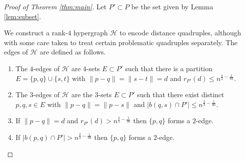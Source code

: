 \documentclass[11pt,oneside]{amsart}
\newcommand{\cG}{\mathcal{G}}
\newcommand{\cH}{\mathcal{H}}
\numberwithin{exercise}{subsection}
\begin{document}
\begin{proof}[Proof of Theorem \ref{thm:main}]
Let $P' \subset P$ be the set given by Lemma \ref{lem:subset}. 

We construct a rank-$4$ hypergraph $\cH$ to encode distance quadruples, although with some care taken to treat certain problematic quadruples separately. The edges of $\cH$ are defined as follows.

\begin{enumerate}
    \item The $4$-edges of $\cH$ are $4$-sets $E\subset P'$ such that there is a partition \(E=\{p,q\}\cup\{s,t\}\) with $\|p-q\|=\|s-t\|=d$ and $r_{P'}(d) \leq n^{\frac{4}{3} - \frac{1}{99}}$.
    \item The $3$-edges of $\cH$ are the $3$-sets \(E\subset P'\) such that
there exist distinct \(p,q,s\in E\) with $\|p-q\|=\|p-s\|$ and $|b(q,s) \cap P'| \leq n^{\frac{2}{3} - \frac{1}{90}}$.
    \item If $\|p-q\|=d$ and $r_{P'}(d) > n^{\frac{4}{3} - \frac{1}{99}}$ then $\{p,q\}$ forms a $2$-edge.
    \item  If $|b(p,q) \cap P'| > n^{\frac{2}{3} - \frac{1}{90}}$ then $\{p,q\}$ forms a $2$-edge.
\end{enumerate}


\end{proof}
\end{document}
